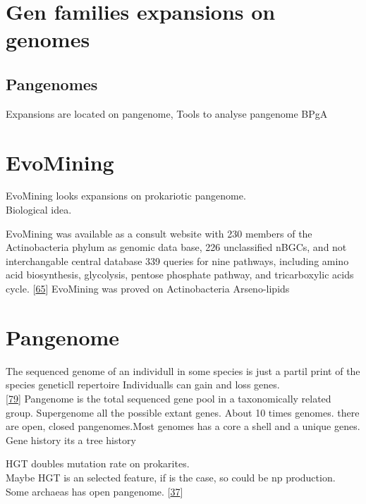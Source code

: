 \documentclass[12pt,twoside]{reedthesis}
\begin{document}
  \section{Gen families expansions on
  genomes}\label{gen-families-expansions-on-genomes}
  
  \subsection{Pangenomes}\label{pangenomes}
  
  Expansions are located on pangenome, Tools to analyse pangenome BPgA
  
  \section{EvoMining}\label{evomining-1}
  
  EvoMining looks expansions on prokariotic pangenome.\\
  Biological idea.
  
  EvoMining was available as a consult website with 230 members of the
  Actinobacteria phylum as genomic data base, 226 unclassified nBGCs, and
  not interchangable central database 339 queries for nine pathways,
  including amino acid biosynthesis, glycolysis, pentose phosphate
  pathway, and tricarboxylic acids cycle.
  {[}\protect\hyperlink{ref-cruz-moralesux5fphylogenomicux5f2016}{65}{]}
  EvoMining was proved on Actinobacteria Arseno-lipids
  
  \section{Pangenome}\label{pangenome}
  
  The sequenced genome of an individull in some species is just a partil
  print of the species geneticll repertoire Individualls can gain and loss
  genes.\\
  {[}\protect\hyperlink{ref-kooninux5fturbulentux5f2015}{79}{]} Pangenome
  is the total sequenced gene pool in a taxonomically related group.
  Supergenome all the possible extant genes. About 10 times genomes. there
  are open, closed pangenomes.Most genomes has a core a shell and a unique
  genes.\\
  Gene history its a tree history
  
  HGT doubles mutation rate on prokarites.\\
  Maybe HGT is an selected feature, if is the case, so could be np
  production.\\
  Some archaeas has open pangenome.
  {[}\protect\hyperlink{ref-halachevux5fcalculatingux5f2011}{37}{]}
  
\end{document}
